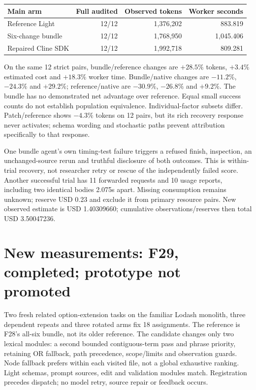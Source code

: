 \documentclass[11pt,a4paper]{article}
\newcommand{\code}[1]{\texttt{\detokenize{#1}}}
\begin{document}
\begin{center}\begin{tabular}{@{}lrrr@{}}\toprule
Main arm & Full audited & Observed tokens & Worker seconds \\\midrule
Reference Light & 12/12 & 1,376,202 & 883.819 \\
Six-change bundle & 12/12 & 1,768,950 & 1,045.406 \\
Repaired Cline SDK & 12/12 & 1,992,718 & 809.281 \\\bottomrule
\end{tabular}\end{center}
On the same 12 strict pairs, bundle/reference changes are $+28.5\%$ tokens,
$+3.4\%$ estimated cost and $+18.3\%$ worker time. Bundle/native changes are
$-11.2\%$, $-24.3\%$ and $+29.2\%$; reference/native are $-30.9\%$,
$-26.8\%$ and $+9.2\%$. The bundle has no demonstrated net advantage over
reference. Equal small success counts do not establish population equivalence.
Individual-factor subsets differ. Patch/reference shows $-4.3\%$ tokens on 12
pairs, but its rich recovery response never activates; schema wording and
stochastic paths prevent attribution specifically to that response.

One bundle agent's own timing-test failure triggers a refused finish, inspection,
an unchanged-source rerun and truthful disclosure of both outcomes. This is
within-trial recovery, not researcher retry or rescue of the independently failed
score. Another successful trial has 11 forwarded requests and 10 usage reports,
including two identical bodies 2.075s apart. Missing consumption remains unknown;
reserve USD 0.23 and exclude it from primary resource pairs. New observed estimate
is USD 1.40309660; cumulative observations/reserves then total USD 3.50047236.

\section{New measurements: F29, completed; prototype not promoted}
Two fresh related option-extension tasks on the familiar Lodash monolith,
three dependent repeats and three rotated arms fix 18 assignments. The reference
is F28's all-six bundle, not its older reference. The candidate changes only two
lexical modules: a second bounded contiguous-term pass and phrase priority,
retaining OR fallback, path precedence, scope/limits and observation guards.
Node fallback prefers within each visited file, not a global exhaustive ranking.
Light schemas, prompt sources, edit and validation modules match. Registration
\code{6b53b2eb} precedes dispatch; no model retry, source repair or feedback occurs.
\end{document}
